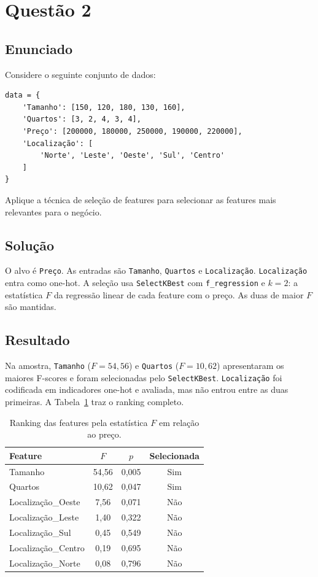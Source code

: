 \section{Questão 2}

\subsection{Enunciado}

Considere o seguinte conjunto de dados:
\begin{verbatim}
data = {
    'Tamanho': [150, 120, 180, 130, 160],
    'Quartos': [3, 2, 4, 3, 4],
    'Preço': [200000, 180000, 250000, 190000, 220000],
    'Localização': [
        'Norte', 'Leste', 'Oeste', 'Sul', 'Centro'
    ]
}
\end{verbatim}
Aplique a técnica de seleção de features para selecionar as features mais relevantes para o negócio.

\subsection{Solução}

O alvo é \texttt{Preço}. As entradas são \texttt{Tamanho}, \texttt{Quartos} e \texttt{Localização}. \texttt{Localização} entra como one-hot. A seleção usa \texttt{SelectKBest} com \texttt{f\_regression} e \(k = 2\): a estatística \(F\) da regressão linear de cada feature com o preço. As duas de maior \(F\) são mantidas.

\subsection{Resultado}

Na amostra, \texttt{Tamanho} (\(F = 54{,}56\)) e \texttt{Quartos} (\(F = 10{,}62\)) apresentaram os maiores F-scores e foram selecionadas pelo \texttt{SelectKBest}. \texttt{Localização} foi codificada em indicadores one-hot e avaliada, mas não entrou entre as duas primeiras. A Tabela~\ref{tab:q2-rank} traz o ranking completo.

\begin{table}[H]
    \centering
    \caption{Ranking das features pela estatística \(F\) em relação ao preço.}
    \label{tab:q2-rank}
    \footnotesize
    \setlength{\tabcolsep}{6pt}
    \begin{tabular}{@{}lccc@{}}
        \toprule
        Feature & \(F\) & \(p\) & Selecionada \\
        \midrule
        Tamanho            & 54,56 & 0,005 & Sim \\
        Quartos            & 10,62 & 0,047 & Sim \\
        Localização\_Oeste &  7,56 & 0,071 & Não \\
        Localização\_Leste &  1,40 & 0,322 & Não \\
        Localização\_Sul   &  0,45 & 0,549 & Não \\
        Localização\_Centro&  0,19 & 0,695 & Não \\
        Localização\_Norte &  0,08 & 0,796 & Não \\
        \bottomrule
    \end{tabular}
\end{table}
